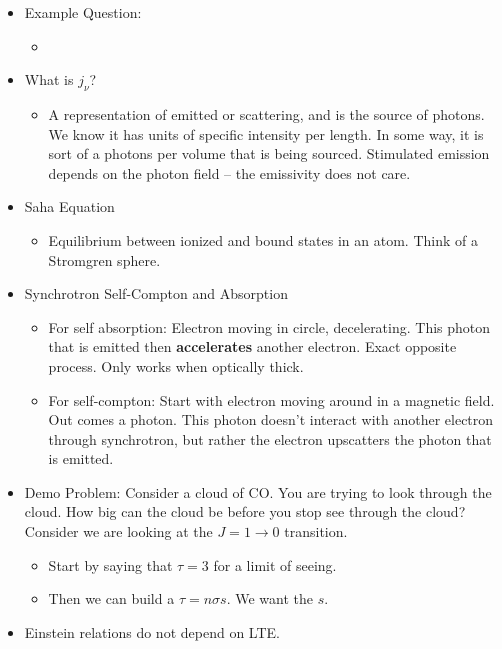 \documentclass{article}
\begin{document}
\begin{itemize}
    \item Example Question:
    \begin{itemize}
        \item 
    \end{itemize}
    
    \item What is $j_\nu$?
    \begin{itemize}
        \item A representation of emitted or scattering, and is the source of photons. We know it has units of specific intensity per length. In some way, it is sort of a photons per volume that is being sourced. Stimulated emission depends on the photon field -- the emissivity does not care. 
    \end{itemize}
    
    \item Saha Equation
    \begin{itemize}
        \item Equilibrium between ionized and bound states in an atom. Think of a Stromgren sphere. 
    \end{itemize}
    
    
    \item Synchrotron Self-Compton and Absorption
    \begin{itemize}
        \item For self absorption: Electron moving in circle, decelerating. This photon that is emitted then \textbf{accelerates} another electron. Exact opposite process. Only works when optically thick.
        \item For self-compton: Start with electron moving around in a magnetic field. Out comes a photon. This photon doesn't interact with another electron through synchrotron, but rather the electron upscatters the photon that is emitted. 
    \end{itemize}
    
    \item Demo Problem: Consider a cloud of CO. You are trying to look through the cloud. How big can the cloud be before you stop see through the cloud? Consider we are looking at the $J=1\to 0$ transition. 
    \begin{itemize}
        \item Start by saying that $\tau = 3$ for a limit of seeing. 
        \item Then we can build a $\tau = n \sigma s$. We want the $s$. 
    \end{itemize}
    
    \item Einstein relations do not depend on LTE. 
\end{itemize}
\end{document}
